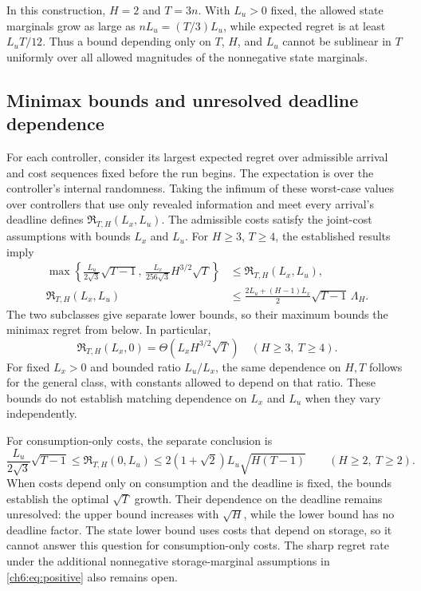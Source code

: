 \documentclass[11pt]{article}
\theoremstyle{plain}
\theoremstyle{remark}
\numberwithin{equation}{section}
\begin{document}
In this construction, $H=2$ and $T=3n$. With $L_u>0$ fixed, the allowed
state marginals grow as large as $nL_u=(T/3)L_u$, while expected regret is
at least $L_uT/12$. Thus a bound depending only on $T$, $H$, and $L_u$
cannot be sublinear in $T$ uniformly over all allowed magnitudes of the
nonnegative state marginals.

\subsection{Minimax bounds and unresolved deadline dependence}
For each controller, consider its largest expected regret over admissible
arrival and cost sequences fixed before the run begins. The expectation
is over the controller's internal randomness. Taking the infimum of
these worst-case values over controllers that use only revealed
information and meet every arrival's deadline defines
$\mathfrak R_{T,H}(L_x,L_u)$. The admissible costs satisfy the joint-cost
assumptions with bounds $L_x$ and $L_u$.
For $H\ge3$, $T\ge4$, the established results imply
\begin{equation}\label{ch6:eq:minimax-sandwich}
 \begin{split}
 \max\left\{\frac{L_u}{2\sqrt3}\sqrt{T-1},\,
 \frac{L_x}{256\sqrt3}H^{3/2}\sqrt T\right\}
 &\le\mathfrak R_{T,H}(L_x,L_u),\\
 \mathfrak R_{T,H}(L_x,L_u)
 &\le\frac{2L_u+(H-1)L_x}{2}
 \sqrt{T-1}\,\Lambda_{H}.
 \end{split}
\end{equation}
The two subclasses give separate lower bounds, so their maximum bounds
the minimax regret from below.
In particular,
\begin{equation}\label{ch6:eq:state-minimax}
 \mathfrak R_{T,H}(L_x,0)
 =\Theta(L_xH^{3/2}\sqrt T)
 \quad(H\ge3,\ T\ge4).
\end{equation}
For fixed $L_x>0$ and bounded ratio $L_u/L_x$, the same dependence on
$H,T$ follows for the general class, with constants allowed to depend
on that ratio. These bounds do not establish matching dependence on
$L_x$ and $L_u$ when they vary independently.

For consumption-only costs, the separate conclusion is
\begin{equation}\label{ch6:eq:action-gap}
 \frac{L_u}{2\sqrt3}\sqrt{T-1}
 \le\mathfrak R_{T,H}(0,L_u)
 \le2(1+\sqrt2)L_u\sqrt{H(T-1)}
 \qquad(H\ge2,\ T\ge2).
\end{equation}
When costs depend only on consumption and the deadline is fixed, the
bounds establish the optimal $\sqrt T$ growth. Their dependence on the
deadline remains unresolved: the upper bound increases with
$\sqrt{H}$, while the lower bound has no deadline factor. The state
lower bound uses costs that depend on storage, so it cannot answer this
question for consumption-only costs. The sharp regret rate under the
additional nonnegative storage-marginal assumptions in
\eqref{ch6:eq:positive} also remains open.
\end{document}
